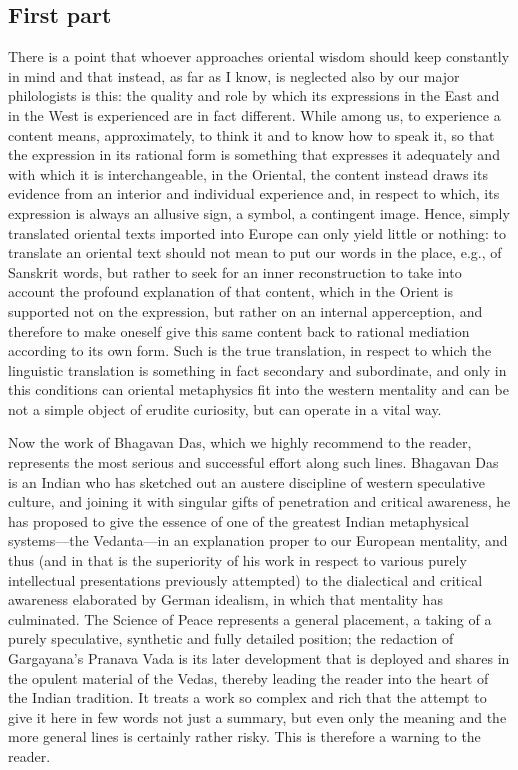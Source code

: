 \subsection*{First part}

There is a point that whoever approaches oriental wisdom should keep constantly in mind and that instead, as far as I know, is neglected also by our major philologists is this: the quality and role by which its expressions in the East and in the West is experienced are in fact different. While among us, to experience a content means, approximately, to think it and to know how to speak it, so that the expression in its rational form is something that expresses it adequately and with which it is interchangeable, in the Oriental, the content instead draws its evidence from an interior and individual experience and, in respect to which, its expression is always an allusive sign, a symbol, a contingent image. Hence, simply translated oriental texts imported into Europe can only yield little or nothing: to translate an oriental text should not mean to put our words in the place, e.g., of Sanskrit words, but rather to seek for an inner reconstruction to take into account the profound explanation of that content, which in the Orient is supported not on the expression, but rather on an internal apperception, and therefore to make oneself give this same content back to rational mediation according to its own form. Such is the true translation, in respect to which the linguistic translation is something in fact secondary and subordinate, and only in this conditions can oriental metaphysics fit into the western mentality and can be not a simple object of erudite curiosity, but can operate in a vital way.

Now the work of Bhagavan Das, which we highly recommend to the reader, represents the most serious and successful effort along such lines. Bhagavan Das is an Indian who has sketched out an austere discipline of western speculative culture, and joining it with singular gifts of penetration and critical awareness, he has proposed to give the essence of one of the greatest Indian metaphysical systems---the Vedanta---in an explanation proper to our European mentality, and thus (and in that is the superiority of his work in respect to various purely intellectual presentations previously attempted) to the dialectical and critical awareness elaborated by German idealism, in which that mentality has culminated. The Science of Peace represents a general placement, a taking of a purely speculative, synthetic and fully detailed position; the redaction of Gargayana's Pranava Vada is its later development that is deployed and shares in the opulent material of the Vedas, thereby leading the reader into the heart of the Indian tradition. It treats a work so complex and rich that the attempt to give it here in few words not just a summary, but even only the meaning and the more general lines is certainly rather risky. This is therefore a warning to the reader.

